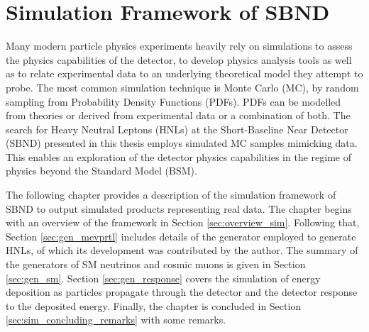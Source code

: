 
\chapter{Simulation Framework of SBND}
\label{ChapterSim}

\ifpdf
    \graphicspath{{Chapter5/Figs/Raster/}{Chapter5/Figs/PDF/}{Chapter5/Figs/}}
\else
    \graphicspath{{Chapter5/Figs/Vector/}{Chapter5/Figs/}}
\fi


Many modern particle physics experiments heavily rely on simulations to assess the physics capabilities of the detector, to develop physics analysis tools as well as to relate experimental data to an underlying theoretical model they attempt to probe.  
The most common simulation technique is Monte Carlo (MC), by random sampling from Probability Density Functions (PDFs).
PDFs can be modelled from theories or derived from experimental data or a combination of both.
The search for Heavy Neutral Leptons (HNLs) at the Short-Baseline Near Detector (SBND) presented in this thesis employs simulated MC samples mimicking data.                                 
This enables an exploration of the detector physics capabilities in the regime of physics beyond the Standard Model (BSM).

The following chapter provides a description of the simulation framework of SBND to output simulated products representing real data.
The chapter begins with an overview of the framework in Section \ref{sec:overview_sim}.
Following that, Section \ref{sec:gen_mevprtl} includes details of the generator employed to generate HNLs, of which its development was contributed by the author.
The summary of the generators of SM neutrinos and cosmic muons is given in Section \ref{sec:gen_sm}.
Section \ref{sec:gen_response} covers the simulation of energy deposition as particles propagate through the detector and the detector response to the deposited energy.
Finally, the chapter is concluded in Section \ref{sec:sim_concluding_remarks} with some remarks.

